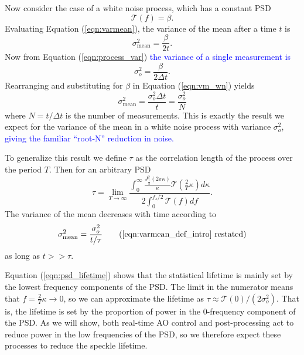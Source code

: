 \documentclass[10pt,preprint]{aastex631}
\newcommand{\jrmadd}[1]{\textcolor{blue}{#1}}
\begin{document}
Now consider the case of a white noise process, which has a constant PSD
\begin{equation}
\mathcal{T}(f) = \beta.
\end{equation}
Evaluating Equation (\ref{eqn:varmean}), the variance of the mean after a time $t$ is 
\begin{equation}
\sigma_\mathrm{mean}^2 = \frac{\beta}{2t}.
\label{eqn:vm_wn}
\end{equation}
Now from Equation (\ref{eqn:process_var}) \jrmadd{the variance of a single measurement is}
\begin{equation}
\sigma_o^2  = \frac{\beta}{2\Delta t}.
\end{equation}
Rearranging and substituting for $\beta$ in Equation (\ref{eqn:vm_wn}) yields
\begin{equation}
\sigma_\mathrm{mean}^2 =  \frac{\sigma_o^2 \Delta t}{t} = \frac{\sigma_o^2}{N}
\end{equation}
where $N = t/\Delta t$ is the number of measurements.  This is exactly the result we expect for the variance of the mean in a white noise process with variance $\sigma^2_o$, \jrmadd{giving the familiar ``root-N'' reduction in noise.}

To generalize this result we define $\tau$ as the correlation length of the process over the period $T$.  Then for an arbitrary PSD
\begin{equation}
\tau = \lim_{T\to\infty}\frac{ \displaystyle\int_0^{\infty} \frac{ J_{\frac{1}{2}}^2(2\pi \kappa)}{\kappa} \mathcal{T}\left( \frac{2}{T} \kappa \right) d\kappa}{ 2 \displaystyle\int_{0}^{f_s/2} \mathcal{T}(f) df}.
\label{eqn:psd_lifetime}
\end{equation}
The variance of the mean decreases with time according to
\begin{equation}
\sigma_\mathrm{mean}^2 =  \frac{\sigma_o^2}{t/\tau} \tag{\ref{eqn:varmean_def_intro} restated}
\end{equation}
as long as $t >> \tau$.

Equation (\ref{eqn:psd_lifetime}) shows that the statistical lifetime is mainly set by the lowest frequency components of the PSD.  The limit in the numerator means that $f = \frac{2}{T}\kappa \rightarrow 0$, so we can approximate the lifetime as $\tau \approx \mathcal{T}(0)/(2\sigma_o^2)$.  That is, the lifetime is set by the proportion of power in the 0-frequency component of the PSD.  As we will show, both real-time AO control and post-processing act to reduce power in the low frequencies of the PSD, so we therefore expect these processes to reduce the speckle lifetime.
\end{document}

